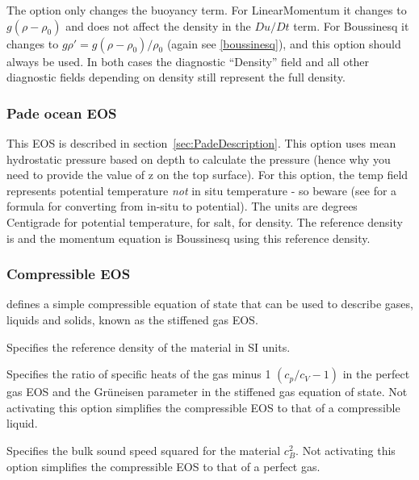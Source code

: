 The option  only changes 
the buoyancy term. For LinearMomentum it changes to 
$g(\rho-\rho_0)$ and does not affect the density in the $Du/Dt$ term. For
Boussinesq it changes to 
$g\rho'=g(\rho-\rho_0)/\rho_0$ (again see \eqref{boussinesq}), 
and this option should always be used.
In both cases the diagnostic
``Density'' field and all other diagnostic fields depending on density
still represent the full density.

\subsubsection{Pade ocean EOS}
This EOS is described in section~\ref{sec:PadeDescription}.
This option uses mean hydrostatic pressure based on depth to calculate the
pressure (hence why you need to provide the value of z on the top surface).
For this option, the temp field represents potential temperature \emph{not} in
situ temperature - so beware (see \citet{mcdougall2003} for a formula for converting
from in-situ to potential). The units are degrees Centigrade for potential
temperature, \PSU{} for salt, \kgmm{} for density. The reference density is
\kgmm[1000] and the momentum equation is Boussinesq using this reference density.

\subsubsection{Compressible EOS}\label{sec:Multi-material compressible EOS}
 defines a simple compressible equation of state that can be used to describe gases, liquids and solids, known as the stiffened gas EOS. %

\begin{description}
\item{} Specifies the reference density of the material in SI units.
\item{} Specifies the ratio of
  specific heats of the gas minus 1 $(c_p/c_V-1)$ in the perfect gas EOS and the
  Gr\"uneisen parameter in the stiffened gas equation of state. Not activating this option simplifies the compressible EOS to that of a compressible liquid.
\item{} Specifies the bulk sound speed squared for the material $c_B^2$. Not activating this option simplifies the compressible EOS to that of a perfect gas.
\end{description}

